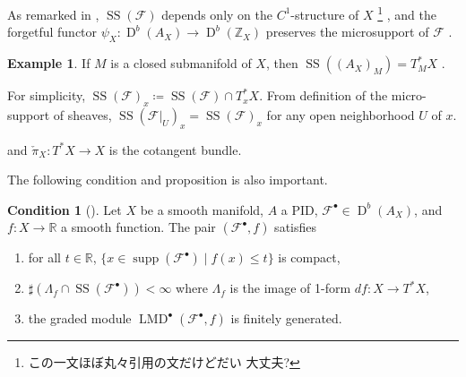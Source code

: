 \documentclass[a4paper,dvipdfmx,reqno,12pt]{amsart}
\theoremstyle{definition}
\newtheorem{example}[theorem]{Example}
\newtheorem{condition}[theorem]{Condition}
\newcommand{\deq}{\coloneqq}
\newcommand{\Z}{\mathbb{Z}}%
\newcommand{\mcal}[1]{\mathcal{#1}}%
\newcommand{\opn}[1]{\operatorname{#1}}
\numberwithin{equation}{section}
\begin{document}
As remarked in \cite[Remark 5.1.6]{MR1299726},
$\opn{SS}(\mcal{F})$ depends only on the 
$C^{1}$-structure of $X$ \footnote{この一文ほぼ丸々引用の文だけどだい
大丈夫?}
, and the forgetful functor 
$\psi_X \colon \opn{D}^{b}(A_X)\to \opn{D}^{b}(\Z_X)$
preserves the microsupport of $\mcal{F}$ 
\cite[Remark 5.1.5]{MR1299726}.

\begin{example}
If $M$ is a closed submanifold of $X$, then
$\opn{SS}((A_{X})_M)=T^{*}_M X$ \cite[Proposition 5.3.2]{MR1299726}.
\end{example}
For simplicity,
$\opn{SS}(\mcal{F})_x\deq \opn{SS}(\mcal{F}) \cap T^{*}_x X$.
From definition of the micro-support of sheaves, 
$\opn{SS}(\mcal{F}|_{U})_x=\opn{SS}(\mcal{F})_x$
for any open neighborhood $U$ of $x$.


and $\check{\pi}_{X}\colon T^{*}X\to X$
is the cotangent bundle. 



The following condition and proposition is also important.
\begin{condition}[{\cite[Proposition 5.4.20]{MR1299726}}]
\label{condition-global-morse}
Let $X$ be a smooth manifold, $A$ a PID, 
$\mathcal{F}^{\bullet}\in \opn{D}^{b}(A_X)$,
and $f\colon X\to \mathbb{R}$ a smooth function.
The pair $(\mathcal{F}^{\bullet},f)$ satisfies
\begin{enumerate}
\item for all $t\in \mathbb{R}$, 
$\{x\in\opn{supp}(\mathcal{F}^{\bullet})\mid f(x)\leq t\}$ 
is compact,
\item $\sharp (\Lambda_f\cap \opn{SS}(\mathcal{F}^{\bullet}))
<\infty$ where $\Lambda_f$ is the image of 1-form 
$df\colon X\to T^{*}X$,
\item the graded module 
$\opn{LMD}^{\bullet}(\mathcal{F}^{\bullet},f)$ 
is finitely generated.



\end{enumerate}

\end{condition}
\end{document}
